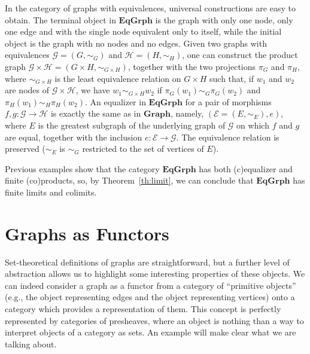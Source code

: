 \documentclass[a4paper, twoside,openright]{report}
\theoremstyle{plain}
\theoremstyle{definition}
\begin{document}

In the category of graphs with equivalences, universal constructions are easy to obtain. 
The terminal object in $\mathbf{EqGrph}$ is the graph with only one node, only one edge and with the single node equivalent only to itself, while the initial object is the graph with no nodes and no edges.
Given two graphs with equivalences $\mathcal{G} = (G, \sim_G) $ and $\mathcal{H} = (H, \sim_{H})$, one can construct the product graph $\mathcal{G \times H} = (G \times H, \sim_{G \times H})$, together with the two projections $\pi_G$ and $\pi_H$,  where $\sim_{G \times H}$ is the least equivalence relation on $G \times H$ such that, if $w_1$ and $w_2$ are nodes of $\mathcal{G \times H}$, we have $w_1 \sim_{G \times H} w_2$ if $\pi_G(w_1) \sim_G \pi_G(w_2)$ and $\pi_H(w_1) \sim_H \pi_H(w_2)$.
An equalizer in $\mathbf{EqGrph}$ for a pair of morphisms $f, g: \mathcal{G \rightarrow H}$ is exactly the same as in $\mathbf{Graph}$, namely, $(\mathcal{E} = (E, \sim_E), e)$, where $E$ is the greatest subgraph of the underlying graph of $\mathcal{G}$ on which $f$ and $g$ are equal, together with the inclusion $e: \mathcal{E \rightarrow G}$. The equivalence relation is preserved ($\sim_E$ is $\sim_G$ restricted to the set of vertices of $E$).

Previous examples show that the category $\mathbf{EqGrph}$ has both (c)equalizer and finite (co)products, so, by Theorem~\ref{th:limit}, we can conclude that $\mathbf{EqGrph}$ has finite limits and colimits.


\section{Graphs as Functors}

Set-theoretical definitions of graphs are straightforward, but a further level of abstraction allows us to highlight some interesting properties of these objects. We can indeed consider a graph as a functor from a category of ``primitive objects'' (e.g., the object representing edges and the object representing vertices) onto a category which provides a representation of them. This concept is perfectly represented by categories of presheaves, where an object is nothing than a way to interpret objects of a category as sets. An example will make clear what we are talking about.
\end{document}
